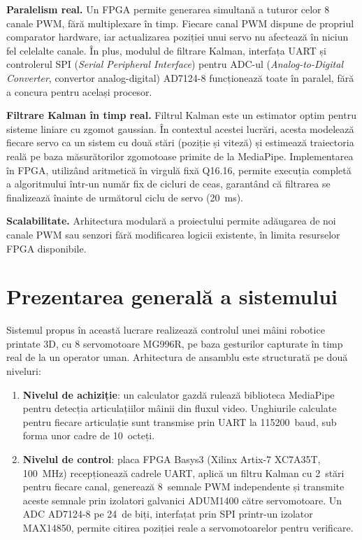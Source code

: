 \textbf{Paralelism real.} Un FPGA permite generarea simultană a tuturor celor
8 canale PWM, fără multiplexare în timp. Fiecare canal PWM dispune de propriul
comparator hardware, iar actualizarea poziției unui servo nu afectează în
niciun fel celelalte canale. În plus, modulul de filtrare Kalman, interfața
UART și controlerul SPI (\textit{Serial Peripheral Interface}) pentru ADC-ul
(\textit{Analog-to-Digital Converter}, convertor analog-digital) AD7124-8
funcționează toate în paralel,
fără a concura pentru același procesor.

\textbf{Filtrare Kalman în timp real.} Filtrul Kalman este un estimator optim
pentru sisteme liniare cu zgomot gaussian. În contextul acestei lucrări, acesta
modelează fiecare servo ca un sistem cu două stări (poziție și viteză)
și estimează traiectoria reală pe baza măsurătorilor zgomotoase primite de la
MediaPipe. Implementarea în FPGA, utilizând aritmetică în virgulă fixă Q16.16,
permite execuția completă a algoritmului într-un număr fix de cicluri de ceas,
garantând că filtrarea se finalizează înainte de următorul ciclu de servo
(20~ms).

\textbf{Scalabilitate.} Arhitectura modulară a proiectului permite adăugarea
de noi canale PWM sau senzori fără modificarea logicii existente, în limita
resurselor FPGA disponibile.

\section{Prezentarea generală a sistemului}
\label{sec:intro-overview}

Sistemul propus în această lucrare realizează controlul unei mâini robotice
printate 3D, cu 8 servomotoare MG996R, pe baza gesturilor capturate în timp
real de la un operator uman. Arhitectura de ansamblu este structurată pe
două niveluri:

\begin{enumerate}
	\item \textbf{Nivelul de achiziție}: un calculator gazdă rulează
	      biblioteca MediaPipe pentru detecția articulațiilor mâinii din fluxul
	      video. Unghiurile calculate pentru fiecare articulație sunt transmise
	      prin UART la 115200~baud, sub forma unor cadre de 10~octeți.
	\item \textbf{Nivelul de control}: placa FPGA Basys3 (Xilinx Artix-7
	      XC7A35T, 100~MHz) recepționează cadrele UART, aplică un filtru Kalman
	      cu 2~stări pentru fiecare canal, generează 8~semnale PWM independente
	      și transmite aceste semnale prin izolatori galvanici ADUM1400 către
	      servomotoare. Un ADC AD7124-8 pe 24~de biți, interfațat prin SPI
	      printr-un izolator MAX14850, permite citirea poziției reale a
	      servomotoarelor pentru verificare.
\end{enumerate}

